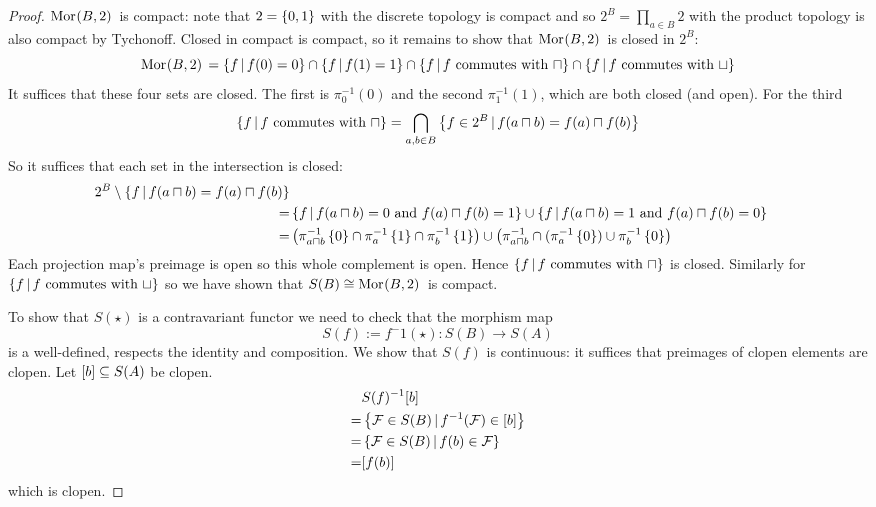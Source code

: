 \begin{proof}
    $\mathrm{Mor}_{}(B, 2)\,$ is compact: 
    note that $2 = \left\{0,1\right\}$ with the discrete topology is compact and
    so $2^B = \prod_{a \in B} 2$ with the product topology is also
    compact by Tychonoff.
    Closed in compact is compact, so it remains to show that $\mathrm{Mor}_{}(B, 2)\,$
    is closed in $2^B$:
    \[
        \mathrm{Mor}_{}(B, 2)\, = \left\{f \,|\, f(0) = 0\right\} \cap \left\{f \,|\, f(1) = 1\right\}
        \cap \left\{f \,|\, f \text{ commutes with $\sqcap$}\right\} \cap 
        \left\{f \,|\, f \text{ commutes with $\sqcup$}\right\}
    \]
    It suffices that these four sets are closed.
    The first is $\pi_0^{-1}(0)$ and the second $\pi_1^{-1}(1)$,
    which are both closed (and open).
    For the third 
    \[
        \left\{f \,|\, f \text{ commutes with $\sqcap$}\right\}=
        \bigcap_{a,b \in B} \left\{f \in 2^B \,|\, f(a \sqcap b) = f(a) \sqcap f(b)\right\}
    \]
    So it suffices that each set in the intersection is closed:
    \begin{align*}
        2^B \setminus \left\{f \,|\, f(a \sqcap b) = f(a) \sqcap f(b)\right\}\\
        = &\left\{f \,|\, f(a \sqcap b) = 0 \text{ and } f(a) \sqcap f(b) = 1\right\}
        \cup \left\{f \,|\, f(a \sqcap b) = 1 \text{ and } f(a) \sqcap f(b) = 0\right\}\\
        = &\left(\pi_{a \sqcap b}^{-1}\left\{0\right\} \cap \pi_a^{-1}\left\{1\right\}
        \cap \pi_b^{-1}\left\{1\right\}\right) \cup 
        \left(\pi_{a \sqcap b}^{-1}
        \cap (\pi_a^{-1}\left\{0\right\}) \cup \pi_b^{-1}\left\{0\right\}\right)
    \end{align*}
    Each projection map's preimage is open so this whole complement is open.
    Hence $\left\{f \,|\, f \text{ commutes with $\sqcap$}\right\}$ is closed.
    Similarly for $\left\{f \,|\, f \text{ commutes with $\sqcup$}\right\}$ so we 
    have shown that $S(B) \cong \mathrm{Mor}_{}(B, 2)\,$ is compact.

    To show that $S(\star)$ 
    is a contravariant functor we need to check that the morphism map
    \[S(f) := f^-1(\star) : S(B) \to S(A)\]
    is a well-defined, respects the identity and composition. 
    We show that $S(f)$ is continuous: 
    it suffices that preimages of clopen elements are clopen.
    Let $[b] \subseteq S(A)$ be clopen. 
    \begin{align*}
        & S(f)^{-1}[b]\\
        =& \left\{\mathcal{F} \in S(B) \,|\, f^{-1}(\mathcal{F}) \in [b]\right\}\\
        =& \left\{\mathcal{F} \in S(B) \,|\, f(b) \in \mathcal{F}\right\}\\
        =& [f(b)]
    \end{align*}
    which is clopen.
\end{proof}

